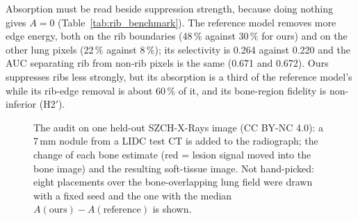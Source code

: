 Absorption must be read beside suppression strength, because doing nothing gives $A=0$ (Table~\ref{tab:rib_benchmark}). The reference model
removes more edge energy, both on the rib boundaries (48\,\% against 30\,\% for ours) and on the other lung pixels (22\,\% against 8\,\%);
its selectivity is 0.264 against 0.220 and the AUC separating rib from non-rib pixels is the same (0.671 and 0.672). Ours suppresses ribs
less strongly, but its absorption is a third of the reference model's while its rib-edge removal is about 60\,\% of it, and its bone-region
fidelity is non-inferior (H2$'$).
\begin{table}[htbp]
\centering\small
\caption{Counterfactual lesion audit on VinDr-RibCXR: mean absorption per method with image-cluster bootstrap intervals (lower is better).}
\label{tab:audit_ribcxr}
\end{table}
\begin{table}[htbp]
\centering\small
\caption{H3$'$ paired site-level contrasts on the three audit sets, Holm over the two contrasts, and the interaction with bone overlap
($\geq$15\,\% vs.\ $<$15\,\%). SZCH is development evidence; the JSRT overlap comes from the reference model's bone map.}
\label{tab:audit_contrasts}
\end{table}
\begin{figure}[htbp]
\centering
{}
\caption{The audit on one held-out SZCH-X-Rays image (CC BY-NC 4.0): a 7\,mm nodule from a LIDC test CT is added to the radiograph; the change
of each bone estimate (red = lesion signal moved into the bone image) and the resulting soft-tissue image. Not hand-picked: eight placements
over the bone-overlapping lung field were drawn with a fixed seed and the one with the median $A(\text{ours})-A(\text{reference})$ is shown.}
\label{fig:audit_maps}
\end{figure}
\begin{table}[htbp]
\centering\small
\caption{Rib benchmark on VinDr-RibCXR (metrics only): gradient-energy reduction on rib-boundary pixels and on other lung pixels, selectivity
and AUC.}
\label{tab:rib_benchmark}
\end{table}

